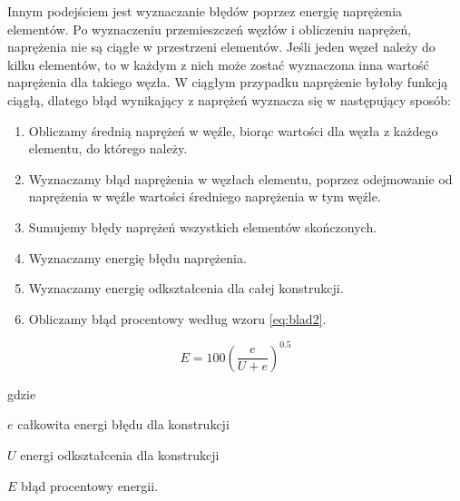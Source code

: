 Innym podejściem jest wyznaczanie błędów poprzez energię naprężenia elementów. Po wyznaczeniu przemieszczeń węzłów i obliczeniu naprężeń, naprężenia nie są ciągłe w przestrzeni elementów. Jeśli jeden węzeł należy do kilku elementów, to w każdym z nich może zostać wyznaczona inna wartość naprężenia dla takiego węzła. W ciągłym przypadku naprężenie byłoby funkcją ciągłą, dlatego błąd wynikający z naprężeń wyznacza się w następujący sposób:

\vspace{3mm}

\begin{enumerate}
	\item Obliczamy średnią naprężeń w węźle, biorąc wartości dla węzła z każdego elementu, do którego należy.
	\item Wyznaczamy błąd naprężenia w węzłach elementu, poprzez odejmowanie od naprężenia w węźle wartości średniego naprężenia w tym węźle.
	\item Sumujemy błędy naprężeń wszystkich elementów skończonych.
	\item Wyznaczamy energię błędu naprężenia.
	\item Wyznaczamy energię odkształcenia dla całej konstrukcji.
	\item Obliczamy błąd procentowy według wzoru \ref{eq:blad2}.
\end{enumerate}

\vspace{3mm}

\begin{equation} \label{eq:blad2}
	E = 100(\frac{e}{U + e})^{0.5}
\end{equation}

gdzie
\begin{eqwhere}[2cm]
	\item[$ e $] całkowita energi błędu dla konstrukcji
	\item[$ U $] energi odkształcenia dla konstrukcji
	\item[$ E $] błąd procentowy energii.
\end{eqwhere}




















